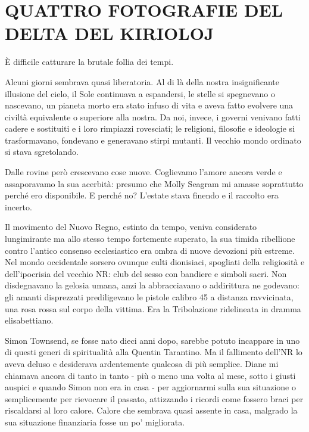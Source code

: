 \chapter{QUATTRO FOTOGRAFIE DEL DELTA DEL KIRIOLOJ}\label{quattro-fotografie-del-delta-del-kirioloj}

\hfill\break

È difficile catturare la brutale follia dei tempi.

Alcuni giorni sembrava quasi liberatoria. Al di là della nostra
insignificante illusione del cielo, il Sole continuava a espandersi, le
stelle si spegnevano o nascevano, un pianeta morto era stato infuso di
vita e aveva fatto evolvere una civiltà equivalente o superiore alla
nostra. Da noi, invece, i governi venivano fatti cadere e sostituiti e i
loro rimpiazzi rovesciati; le religioni, filosofie e ideologie si
trasformavano, fondevano e generavano stirpi mutanti. Il vecchio mondo
ordinato si stava sgretolando.

Dalle rovine però crescevano cose nuove. Coglievamo l'amore ancora verde
e assaporavamo la sua acerbità: presumo che Molly Seagram mi amasse
soprattutto perché ero disponibile. E perché no? L'estate stava finendo
e il raccolto era incerto.

Il movimento del Nuovo Regno, estinto da tempo, veniva considerato
lungimirante ma allo stesso tempo fortemente superato, la sua timida
ribellione contro l'antico consenso ecclesiastico era ombra di nuove
devozioni più estreme. Nel mondo occidentale sorsero ovunque culti
dionisiaci, spogliati della religiosità e dell'ipocrisia del vecchio NR:
club del sesso con bandiere e simboli sacri. Non disdegnavano la gelosia
umana, anzi la abbracciavano o addirittura ne godevano: gli amanti
disprezzati prediligevano le pistole calibro 45 a distanza ravvicinata,
una rosa rossa sul corpo della vittima. Era la Tribolazione ridelineata
in dramma elisabettiano.

Simon Townsend, se fosse nato dieci anni dopo, sarebbe potuto incappare
in uno di questi generi di spiritualità alla Quentin Tarantino. Ma il
fallimento dell'NR lo aveva deluso e desiderava ardentemente qualcosa di
più semplice. Diane mi chiamava ancora di tanto in tanto - più o meno
una volta al mese, sotto i giusti auspici e quando Simon non era in casa
- per aggiornarmi sulla sua situazione o semplicemente per rievocare il
passato, attizzando i ricordi come fossero braci per riscaldarsi al loro
calore. Calore che sembrava quasi assente in casa, malgrado la sua
situazione finanziaria fosse un po' migliorata.

